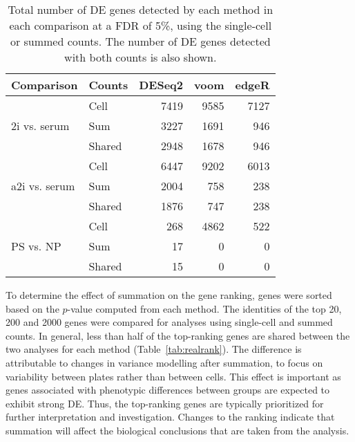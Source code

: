 \documentclass{article}
\begin{document}
\begin{table}[btp]
\caption{Total number of DE genes detected by each method in each comparison at a FDR of 5\%, using the single-cell or summed counts.
The number of DE genes detected with both counts is also shown.
}
\label{tab:realnum}
\begin{center}
\begin{tabular}{l l r r r}
\hline
\textbf{Comparison} & \textbf{Counts} & \textbf{DESeq2} & \textbf{voom} & \textbf{edgeR} \\
\hline
\multirow{3}{*}{2i vs. serum} 
& Cell & 7419 & 9585 & 7127 \\
& Sum & 3227 & 1691 & 946 \\
& Shared & 2948 & 1678 & 946 \\
\hline
\multirow{3}{*}{a2i vs. serum} 
& Cell & 6447 & 9202 & 6013 \\
& Sum & 2004 & 758 & 238 \\
& Shared & 1876 & 747 & 238 \\
\hline
\multirow{3}{*}{PS vs. NP} 
& Cell & 268 & 4862 & 522 \\
& Sum & 17 & 0 & 0 \\
& Shared & 15 & 0 & 0 \\
\hline
\end{tabular}
\end{center}
\end{table}

To determine the effect of summation on the gene ranking, genes were sorted based on the $p$-value computed from each method.
The identities of the top 20, 200 and 2000 genes were compared for analyses using single-cell and summed counts.
In general, less than half of the top-ranking genes are shared between the two analyses for each method (Table~\ref{tab:realrank}).
The difference is attributable to changes in variance modelling after summation, to focus on variability between plates rather than between cells.
This effect is important as genes associated with phenotypic differences between groups are expected to exhibit strong DE.
Thus, the top-ranking genes are typically prioritized for further interpretation and investigation.
Changes to the ranking indicate that summation will affect the biological conclusions that are taken from the analysis.
\end{document}
